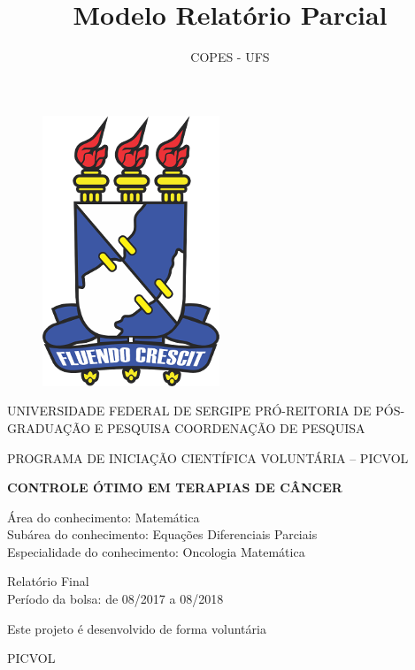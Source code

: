 \documentclass[12pt, a4paper]{article}
\author{COPES - UFS}
\title{Modelo Relatório Parcial}
\date{}
\begin{document}
\begin{figure}[!h]
    \centering
    \includegraphics[scale=1.2]{ufs.png}

  \end{figure}

 \begin{center}
 
 \Large UNIVERSIDADE FEDERAL DE SERGIPE
PRÓ-REITORIA DE PÓS-GRADUAÇÃO E PESQUISA
COORDENAÇÃO DE PESQUISA
\vspace{10mm} 

\normalsize PROGRAMA DE INICIAÇÃO CIENTÍFICA VOLUNTÁRIA – PICVOL

\vspace{20mm}

\textbf{\Large CONTROLE ÓTIMO EM TERAPIAS DE CÂNCER}

\vspace{20mm}
 {\normalsize Área do conhecimento: Matemática\\
Subárea do conhecimento: Equações Diferenciais Parciais\\
Especialidade do conhecimento: Oncologia Matemática\\}
\vspace{20mm}

{\normalsize Relatório Final\\
Período da bolsa: de 08/2017 a 08/2018}
\vspace{10mm}

 {\large Este projeto é desenvolvido de forma voluntária}
\vspace{10mm}

\large{PICVOL}


 \end{center}

 
\newpage
\end{document}
